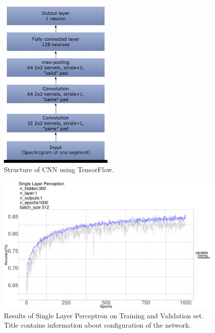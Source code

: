 \documentclass[a4paper]{article}
\begin{document}
\begin{figure}
\centering
\includegraphics[width=0.5\textwidth]{CNN.png}
\caption{\label{fig:CNN}Structure of CNN using TensorFlow.}
\end{figure}


\begin{figure} 
\centering
\includegraphics[width=1.0\textwidth]{MLP_2.png}
\caption{\label{fig:MLP_2}Results of Single Layer Perceptron on Training and Validation set. Title contains information about configuration of the network.}
\end{figure}
\end{document}
